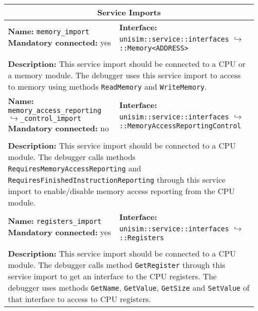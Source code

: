 \begin{center}
\begin{tabular}{|p{7.5cm}|p{7.5cm}|}
		\hline
		\hline
		\multicolumn{2}{|c|}{\textbf{\large Service Imports}}\\
		\hline
		\multicolumn{1}{|p{7.5cm}}{\textbf{Name:} \texttt{memory\_import} \newline \textbf{Mandatory connected:} yes} & \multicolumn{1}{p{7.5cm}|}{\textbf{Interface:} \newline \texttt{unisim::service::interfaces} \newline$\hookrightarrow$\texttt{::Memory<ADDRESS>}}\\
		\multicolumn{2}{|l|}{}\\
		\multicolumn{2}{|p{15cm}|}{\textbf{Description:} \newline This service import should be connected to a CPU or a memory module. The debugger uses this service import to access to memory using methods \texttt{ReadMemory} and \texttt{WriteMemory}.}\\
		\hline
		\multicolumn{1}{|p{7.5cm}}{\textbf{Name:} \texttt{memory\_access\_reporting\newline$\hookrightarrow$\_control\_import} \newline \textbf{Mandatory connected:} no} & \multicolumn{1}{p{7.5cm}|}{\textbf{Interface:} \newline \texttt{unisim::service::interfaces} \newline$\hookrightarrow$\texttt{::MemoryAccessReportingControl}}\\
		\multicolumn{2}{|l|}{}\\
		\multicolumn{2}{|p{15cm}|}{\textbf{Description:} \newline This service import should be connected to a CPU module. The debugger calls methods \texttt{RequiresMemoryAccessReporting} and \texttt{RequiresFinishedInstructionReporting} through this service import to enable/disable memory access reporting from the CPU module.}\\
		\hline
		\multicolumn{1}{|p{7.5cm}}{\textbf{Name:} \texttt{registers\_import} \newline \textbf{Mandatory connected:} yes} & \multicolumn{1}{p{7.5cm}|}{\textbf{Interface:} \newline \texttt{unisim::service::interfaces} \newline$\hookrightarrow$\texttt{::Registers}}\\
		\multicolumn{2}{|l|}{}\\
		\multicolumn{2}{|p{15cm}|}{\textbf{Description:} \newline This service import should be connected to a CPU module. The debugger calls method \texttt{GetRegister} through this service import to get an interface to the CPU registers. The debugger uses methods \texttt{GetName}, \texttt{GetValue}, \texttt{GetSize} and \texttt{SetValue} of that interface to access to CPU registers.}\\
		\hline
	\end{tabular}
\end{center}

